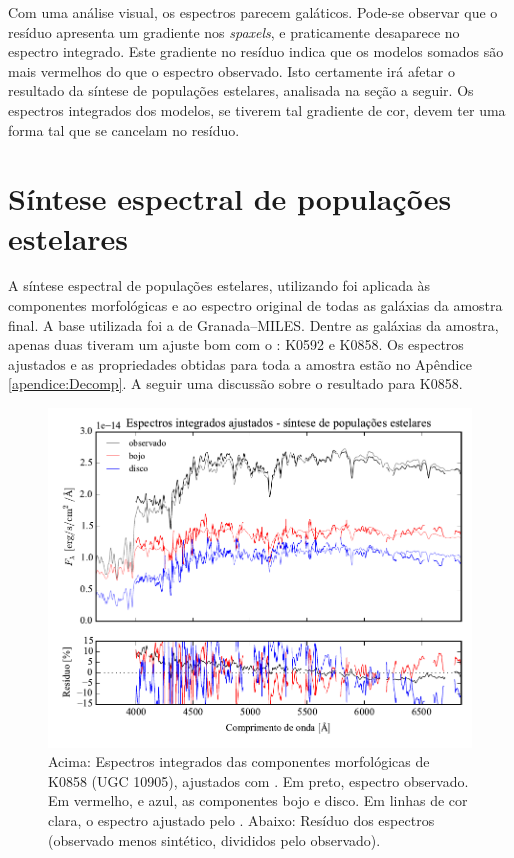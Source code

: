Com uma análise visual, os espectros parecem galáticos. Pode-se observar que o
resíduo apresenta um gradiente nos {\em spaxels}, e praticamente desaparece no
espectro integrado. Este gradiente no resíduo indica que os modelos somados são
mais vermelhos do que o espectro observado. Isto certamente irá afetar o
resultado da síntese de populações estelares, analisada na seção a seguir. Os
espectros integrados dos modelos, se tiverem tal gradiente de cor, devem ter uma
forma tal que se cancelam no resíduo.

\section{Síntese espectral de populações estelares}
\label{sec:Decomp:sintese}

A síntese espectral de populações estelares, utilizando \starlight foi aplicada
às componentes morfológicas e ao espectro original de todas as galáxias da
amostra final. A base utilizada foi a de Granada--MILES. Dentre as galáxias da
amostra, apenas duas tiveram um ajuste bom com o \starlight: K0592 e K0858. Os
espectros ajustados e as propriedades obtidas para toda a amostra estão no
Apêndice \ref{apendice:Decomp}. A seguir uma discussão sobre o resultado para
K0858.

\begin{figure}
	\includegraphics[page=15,width=\textwidth]{figuras/sample006a_synthesis}
	\caption[Espectros ajustados com \starlight das componentes morfológicas de
	K0858 (UGC 10905)]
	{Acima: Espectros integrados das componentes morfológicas de
	K0858 (UGC 10905), ajustados com \starlight. Em preto, espectro observado. Em
	vermelho, e azul, as componentes bojo e disco. Em linhas de cor clara, o
	espectro ajustado pelo \starlight. Abaixo: Resíduo dos espectros (observado
	menos sintético, divididos pelo observado).}
	\label{fig:decompSinteseSpec}
\end{figure}

